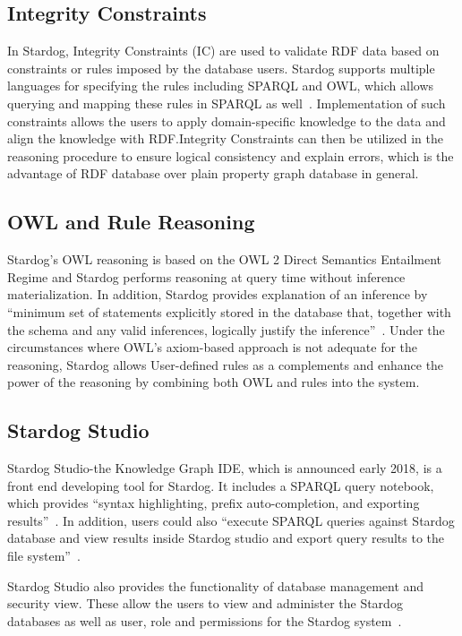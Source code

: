 	\subsection{Integrity Constraints}
		In Stardog, Integrity Constraints (IC) are used to validate RDF data 
		based on constraints or rules imposed by the database users. Stardog 
		supports multiple languages for specifying the rules including SPARQL 
		and OWL, which allows querying and mapping these rules in SPARQL as 
		well~\cite{hid-sp18-405-www-stardog-docs}. Implementation of such 
		constraints allows the users to apply domain-specific knowledge to the 
		data and align the knowledge with RDF.\@ Integrity Constraints can then 
		be utilized in the reasoning procedure to ensure logical consistency and 
		explain errors, which is the advantage of RDF database over plain 
		property graph database in general. 

	\subsection{OWL and Rule Reasoning}
		Stardog’s OWL reasoning is based on the OWL 2 Direct Semantics 
		Entailment Regime and Stardog performs reasoning at query time 
		without inference materialization. In addition, Stardog provides 
		explanation of an inference by ``minimum set of statements explicitly 
		stored in the database that, together with the schema and any valid 
		inferences, logically justify the 
		inference''~\cite{hid-sp18-405-www-stardog-docs}. Under the 
		circumstances where OWL’s axiom-based approach is not adequate for 
		the reasoning, Stardog allows User-defined rules as a complements and 
		enhance the power of the reasoning by combining both OWL and rules 
		into the system. 

	\subsection{Stardog Studio}
		Stardog Studio-the Knowledge Graph IDE, which is announced early 
		2018, is a front end developing tool for Stardog. It includes a SPARQL 
		query notebook, which provides ``syntax highlighting, prefix 
		auto-completion, and exporting 
		results''~\cite{hid-sp18-405-blog-stardog-studio}. In addition, users 
		could also ``execute SPARQL queries against Stardog database and 
		view results inside Stardog studio and export query results to the file 
		system''~\cite{hid-sp18-405-www-stardog-studio}.
		
		Stardog Studio also provides the functionality of database management 
		and security view. These allow the users to view and administer the 
		Stardog databases as well as user, role and permissions for the Stardog 
		system~\cite{hid-sp18-405-blog-stardog-studio}.
		
